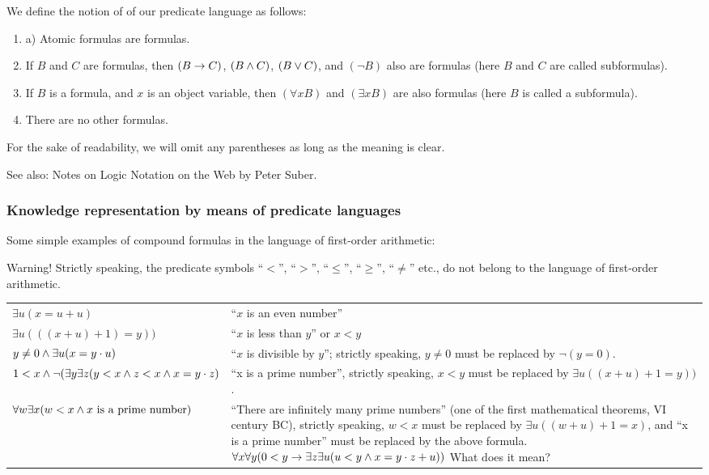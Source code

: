 We define the notion of  of our predicate language as follows:

\begin{enumerate}
    \item a) Atomic formulas are formulas.
    \item If \(B\) and \(C\) are formulas, then \((B\rightarrow C)\), \((B\wedge C)\), \((B\vee C)\), and \((\neg B)\) also are formulas (here \(B\) and \(C\) are called subformulas).
    \item If \(B\) is a formula, and \(x\) is an object variable, then \((\forall x B)\) and \((\exists x B)\) are also formulas (here \(B\) is called a subformula).
    \item There are no other formulas.
\end{enumerate}

\begin{remark}
For the sake of readability, we will omit any parentheses as long as the meaning is clear.
\end{remark}

See also:
Notes on Logic Notation on the Web by Peter Suber.

\subsubsection{Knowledge representation by means of predicate languages}

\begin{example}
Some simple examples of compound formulas in the language of first-order arithmetic:

Warning! Strictly speaking, the predicate symbols ``\(<\)'', ``\(>\)'', ``\(\leq\)'', ``\(\geq\)'', ``\(\ne\)'' etc., do not belong to the language of first-order arithmetic.

\begin{center}
\begin{tabular}{p{7cm} p{8cm}}
\(\exists u(x=u+u)\)
& ``\(x\) is an even number'' \\
\(\exists u(((x+u)+1)=y))\)
& ``\(x\) is less than \(y\)'' or \(x<y\) \\
\(y\neq0 \wedge  \exists u(x=y\cdot u)\)
& ``\(x\) is divisible by \(y\)''; strictly speaking, \(y\neq0\) must be replaced by \(\neg(y=0)\). \\
\(1<x\wedge\neg (\exists y\exists z(y<x\wedge z<x\wedge x=y\cdot z)\)
& ``x is a prime number'', strictly speaking, \(x<y\) must be replaced by \(\exists u((x+u)+1=y))\). \\
\(\forall w\exists x(w<x\wedge x\text{ is a prime number})\)
& ``There are infinitely many prime numbers'' (one of the first mathematical theorems, VI century BC), strictly speaking, \(w<x\) must be replaced by \(\exists u((w+u)+1=x)\), and ``x is a prime number'' must be replaced by the above formula.
\(\forall x\forall y(0<y \rightarrow  \exists z\exists u(u<y \wedge  x=y\cdot z+u))\) What does it mean?
\end{tabular}
\end{center}
\end{example}

